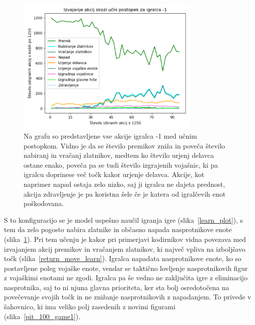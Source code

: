 \documentclass[a4paper, 12pt]{book}
\begin{document}
\begin{figure}[h!]
	\begin{center}
		\includegraphics[width=0.8\textwidth]{photos/all_acts_playerminus1.pdf}
	\end{center}
	\caption{Na grafu so predstavljene vse akcije igralca -1 med učnim postopkom.
		Vidno je da se število premikov zniža in poveča število nabiranj in vračanj zlatnikov, medtem ko število urjenj delavca ostane enako, poveča pa se tudi število izgrajenih vojašnic, ki pa igralcu doprinese več točk kakor urjenje delavca.
		Akcije, kot naprimer napad ostaja zelo nizko, saj ji igralca ne dajeta prednost, akcija zdravljenje je pa koristna šele če je katera od igralčevih enot poškodovana. }
	\label{all_acts_playerminus1}
\end{figure}
S to konfiguracijo se je model uspešno naučil igranja igre (slika~\ref{learn_plot}), s tem da zelo pogosto nabira zlatnike in občasno napada nasprotnikove enote (slika~\ref{all_acts_playerminus1}).
Pri tem učenju je kakor pri primerjavi kodirnikov vidna povezava med izvajanjem akcij premikov in vračanjem zlatnikov, ki največ vpliva na izboljšavo točk (slika~\ref{return_move_learn}).
Igralca napadata nasprotnikove enote, ko so postavljene poleg vojaške enote, vendar se taktično lovljenje nasprotnikovih figur z vojaškimi enotami ne zgodi.
Igralca pa še vedno ne zaključita igre z eliminacijo nasprotnika, saj to ni njuna glavna prioriteta, ker sta bolj osredotočena na povečevanje svojih točk in ne znižanje nasprotnikovih z napadanjem.
To privede v šahovnico, ki ima veliko polj zasedenih z novimi figurami (slika~\ref{pit_100_game1}).
\end{document}
